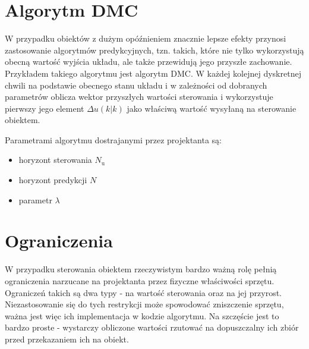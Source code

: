 \section{Algorytm DMC}
W przypadku obiektów z dużym opóźnieniem znacznie lepsze efekty przynosi zastosowanie algorytmów predykcyjnych, tzn. takich, które nie tylko wykorzystują obecną wartość wyjścia układu, ale także przewidują jego przyszłe zachowanie. Przykładem takiego algorytmu jest algorytm DMC. W każdej kolejnej dyskretnej chwili na podstawie obecnego stanu układu i w zależności od dobranych parametrów oblicza wektor przyszłych wartości sterowania i wykorzystuje pierwszy jego element $\Delta u(k|k)$ jako właściwą wartość wysyłaną na sterowanie obiektem.

Parametrami algorytmu dostrajanymi przez projektanta są:

\begin{itemize}
	\item horyzont sterowania $N_{\mathrm{u}}$
	\item horyzont predykcji $N$
	\item parametr $\lambda$
\end{itemize} 

\section{Ograniczenia}
W przypadku sterowania obiektem rzeczywistym bardzo ważną rolę pełnią ograniczenia narzucane na projektanta przez fizyczne właściwości sprzętu. Ograniczeń takich są dwa typy - na wartość sterowania oraz na jej przyrost. Niezastosowanie się do tych restrykcji może spowodować zniszczenie sprzętu, ważna jest więc ich implementacja w kodzie algorytmu. Na szczęście jest to bardzo proste - wystarczy obliczone wartości rzutować na dopuszczalny ich zbiór przed przekazaniem ich na obiekt.